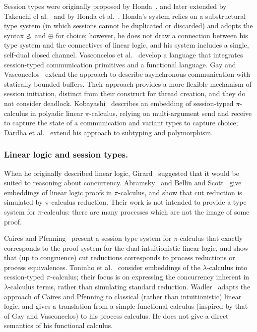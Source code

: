 \documentclass[oribibl,orivec,envcountsame]{llncs}
\begin{document}
Session types were originally proposed by Honda~\cite{Honda93}, and later extended by Takeuchi el
al.~\cite{Takeuchi94} and by Honda et al.~\cite{Honda98}.  Honda's system relies on a substructural
type system (in which sessions cannot be duplicated or discarded) and adopts the syntax $\mathbin\binampersand$ and
$\oplus$ for choice; however, he does not draw a connection between his type system and the
connectives of linear logic, and his system includes a single, self-dual closed channel.
Vasconcelos et al.~\cite{VasconcelosGR06} develop a language that integrates session-typed
communication primitives and a functional language.  Gay and Vasconcelos~\cite{GayVasconcelos10}
extend the approach to describe asynchronous communication with statically-bounded buffers.  Their
approach provides a more flexible mechanism of session initiation, distinct from their construct for
thread creation, and they do not consider deadlock.  Kobayashi~\cite{Kobayashi02} describes an
embedding of session-typed $\pi$-calculus in polyadic linear $\pi$-calculus, relying on
multi-argument send and receive to capture the state of a communication and variant types to capture
choice; Dardha et al.~\cite{Dardha12} extend his approach to subtyping and polymorphism.

\subsubsection{Linear logic and session types.}

When he originally described linear logic, Girard~\cite{Girard87} suggested that it would be suited
to reasoning about concurrency.  Abramsky~\cite{Abramsky92} and Bellin and
Scott~\cite{BellinScott94} give embeddings of linear logic proofs in $\pi$-calculus, and show that
cut reduction is simulated by $\pi$-calculus reduction.  Their work is not intended to provide a
type system for $\pi$-calculus: there are many processes which are not the image of some proof.

Caires and Pfenning~\cite{CairesPfenning10} present a session type system for $\pi$-calculus that
exactly corresponds to the proof system for the dual intuitionistic linear logic, and show that (up
to congruence) cut reductions corresponds to process reductions or process equivalences.  Toninho et
al.~\cite{ToninhoCP12} consider embeddings of the $\lambda$-calculus into session-typed
$\pi$-calculus; their focus is on expressing the concurrency inherent in $\lambda$-calculus terms,
rather than simulating standard reduction.  Wadler~\cite{Wadler14} adapts the approach of Caires and
Pfenning to classical (rather than intuitionistic) linear logic, and gives a translation from a
simple functional calculus (inspired by that of Gay and Vasconcelos) to his process calculus.  He
does not give a direct semantics of his functional calculus.
\end{document}
